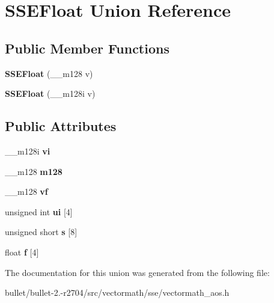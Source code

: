 \hypertarget{union_s_s_e_float}{\section{S\+S\+E\+Float Union Reference}
\label{union_s_s_e_float}
}
\subsection*{Public Member Functions}
\begin{DoxyCompactItemize}
\item 
\hypertarget{union_s_s_e_float_a5338f71202408d7521712695b644fe92}{{\bfseries S\+S\+E\+Float} (\+\_\+\+\_\+m128 v)}\label{union_s_s_e_float_a5338f71202408d7521712695b644fe92}

\item 
\hypertarget{union_s_s_e_float_a31b48cfb8af4d4b843a0a20535360ee1}{{\bfseries S\+S\+E\+Float} (\+\_\+\+\_\+m128i v)}\label{union_s_s_e_float_a31b48cfb8af4d4b843a0a20535360ee1}

\end{DoxyCompactItemize}
\subsection*{Public Attributes}
\begin{DoxyCompactItemize}
\item 
\hypertarget{union_s_s_e_float_a6b8f496a26c177ab482ccb8a36c73ddb}{\+\_\+\+\_\+m128i {\bfseries vi}}\label{union_s_s_e_float_a6b8f496a26c177ab482ccb8a36c73ddb}

\item 
\hypertarget{union_s_s_e_float_a43b3ec91b2407216ad6f50dbb40969b1}{\+\_\+\+\_\+m128 {\bfseries m128}}\label{union_s_s_e_float_a43b3ec91b2407216ad6f50dbb40969b1}

\item 
\hypertarget{union_s_s_e_float_a8fcfcd25220108144aa83e3161ff71eb}{\+\_\+\+\_\+m128 {\bfseries vf}}\label{union_s_s_e_float_a8fcfcd25220108144aa83e3161ff71eb}

\item 
\hypertarget{union_s_s_e_float_a2dc78905cd1baf7ef65141e319c09326}{unsigned int {\bfseries ui} \mbox{[}4\mbox{]}}\label{union_s_s_e_float_a2dc78905cd1baf7ef65141e319c09326}

\item 
\hypertarget{union_s_s_e_float_a30e3c6643eacca62af8d074f5e9bef63}{unsigned short {\bfseries s} \mbox{[}8\mbox{]}}\label{union_s_s_e_float_a30e3c6643eacca62af8d074f5e9bef63}

\item 
\hypertarget{union_s_s_e_float_aa6095e2b885a2b0d49e880a95865d256}{float {\bfseries f} \mbox{[}4\mbox{]}}\label{union_s_s_e_float_aa6095e2b885a2b0d49e880a95865d256}

\end{DoxyCompactItemize}


The documentation for this union was generated from the following file\+:\begin{DoxyCompactItemize}
\item 
bullet/bullet-\/2.-\/r2704/src/vectormath/sse/vectormath\+\_\+aos.\+h\end{DoxyCompactItemize}
